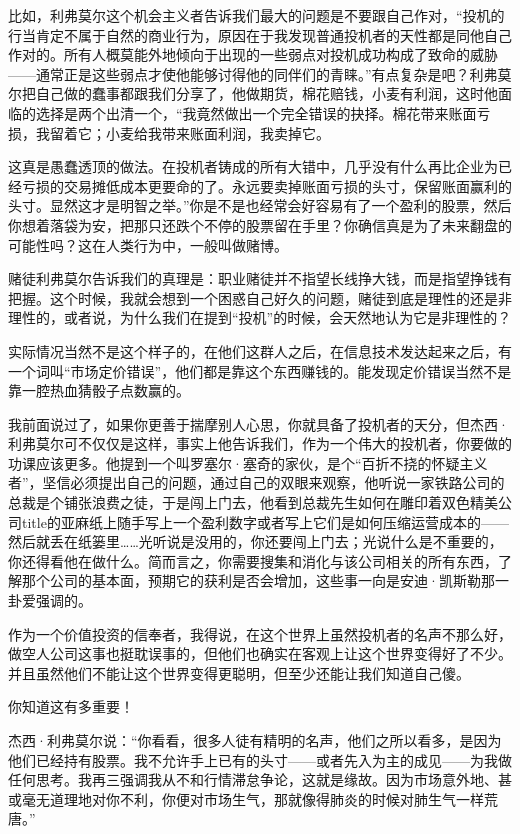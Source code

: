 比如，利弗莫尔这个机会主义者告诉我们最大的问题是不要跟自己作对，``投机的行当肯定不属于自然的商业行为，原因在于我发现普通投机者的天性都是同他自己作对的。所有人概莫能外地倾向于出现的一些弱点对投机成功构成了致命的威胁------通常正是这些弱点才使他能够讨得他的同伴们的青睐。''有点复杂是吧？利弗莫尔把自己做的蠢事都跟我们分享了，他做期货，棉花赔钱，小麦有利润，这时他面临的选择是两个出清一个，``我竟然做出一个完全错误的抉择。棉花带来账面亏损，我留着它；小麦给我带来账面利润，我卖掉它。

这真是愚蠢透顶的做法。在投机者铸成的所有大错中，几乎没有什么再比企业为已经亏损的交易摊低成本更要命的了。永远要卖掉账面亏损的头寸，保留账面赢利的头寸。显然这才是明智之举。''你是不是也经常会好容易有了一个盈利的股票，然后你想着落袋为安，把那只还跌个不停的股票留在手里？你确信真是为了未来翻盘的可能性吗？这在人类行为中，一般叫做赌博。

赌徒利弗莫尔告诉我们的真理是：职业赌徒并不指望长线挣大钱，而是指望挣钱有把握。这个时候，我就会想到一个困惑自己好久的问题，赌徒到底是理性的还是非理性的，或者说，为什么我们在提到``投机''的时候，会天然地认为它是非理性的？

实际情况当然不是这个样子的，在他们这群人之后，在信息技术发达起来之后，有一个词叫``市场定价错误''，他们都是靠这个东西赚钱的。能发现定价错误当然不是靠一腔热血猜骰子点数赢的。

我前面说过了，如果你更善于揣摩别人心思，你就具备了投机者的天分，但杰西·利弗莫尔可不仅仅是这样，事实上他告诉我们，作为一个伟大的投机者，你要做的功课应该更多。他提到一个叫罗塞尔·塞奇的家伙，是个``百折不挠的怀疑主义者''，坚信必须提出自己的问题，通过自己的双眼来观察，他听说一家铁路公司的总裁是个铺张浪费之徒，于是闯上门去，他看到总裁先生如何在雕印着双色精美公司title的亚麻纸上随手写上一个盈利数字或者写上它们是如何压缩运营成本的------然后就丢在纸篓里\ldots\ldots 光听说是没用的，你还要闯上门去；光说什么是不重要的，你还得看他在做什么。简而言之，你需要搜集和消化与该公司相关的所有东西，了解那个公司的基本面，预期它的获利是否会增加，这些事一向是安迪·凯斯勒那一卦爱强调的。

作为一个价值投资的信奉者，我得说，在这个世界上虽然投机者的名声不那么好，做空人公司这事也挺耽误事的，但他们也确实在客观上让这个世界变得好了不少。并且虽然他们不能让这个世界变得更聪明，但至少还能让我们知道自己傻。

你知道这有多重要！

杰西·利弗莫尔说：``你看看，很多人徒有精明的名声，他们之所以看多，是因为他们已经持有股票。我不允许手上已有的头寸------或者先入为主的成见------为我做任何思考。我再三强调我从不和行情滞怠争论，这就是缘故。因为市场意外地、甚或毫无道理地对你不利，你便对市场生气，那就像得肺炎的时候对肺生气一样荒唐。''

